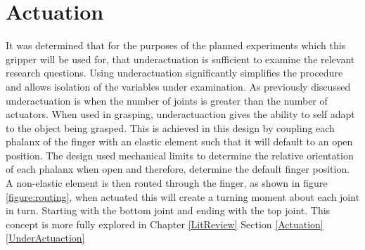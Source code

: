 \section{Actuation}
It was determined that for the purposes of the planned experiments which this gripper will be used for, that underactuation is sufficient to examine the relevant research questions. Using underactuation significantly simplifies the procedure and allows isolation of the variables under examination. As previously discussed underactuation is when the number of joints is greater than the number of actuators. When used in grasping, underactuaction gives the ability to self adapt to the object being grasped. This is achieved in this design by coupling each phalanx of the finger with an elastic element such that it will default to an open position. The design used mechanical limits to determine the relative orientation of each phalanx when open and therefore, determine the default finger position. A non-elastic element is then routed through the finger, as shown in figure \ref{figure:routing}, when actuated this will create a turning moment about each joint in turn. Starting with the bottom joint and ending with the top joint. This concept is more fully explored in Chapter \ref{LitReview} Section \ref{Actuation}\ref{UnderActuaction}

